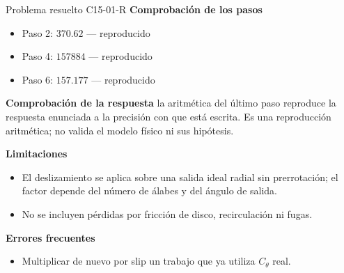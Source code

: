 \documentclass[10pt,openany]{book}
\begin{document}
\begin{studiumworked}{Problema resuelto C15-01-R}
\noindent\textbf{Comprobación de los pasos}
\begin{itemize}
\item Paso 2: $370.62$ — reproducido
\item Paso 4: $157884$ — reproducido
\item Paso 6: $157.177$ — reproducido
\end{itemize}

\noindent\textbf{Comprobación de la respuesta} la aritmética del último paso reproduce la respuesta enunciada a la precisión con que está escrita. Es una reproducción aritmética; no valida el modelo físico ni sus hipótesis.

\noindent\textbf{Limitaciones}
\begin{itemize}
\item El deslizamiento se aplica sobre una salida ideal radial sin prerrotación; el factor depende del número de álabes y del ángulo de salida.
\item No se incluyen pérdidas por fricción de disco, recirculación ni fugas.
\end{itemize}

\noindent\textbf{Errores frecuentes}
\begin{itemize}
\item Multiplicar de nuevo por slip un trabajo que ya utiliza $C_\theta$ real.
\end{itemize}
\end{studiumworked}
\end{document}
